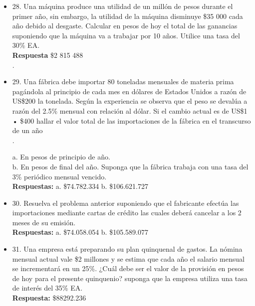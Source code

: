 \begin{itemize}
	\item 28. Una máquina produce una utilidad de un millón de pesos durante el primer año, sin embargo, la utilidad de la máquina disminuye \$35 000 cada año debido al desgaste. Calcular en pesos de hoy el total de las ganancias suponiendo que la máquina va a trabajar por 10 años. Utilice una tasa del 30\% EA.\\
	\textbf{Respuesta} \$2 815 488\\.
	\medskip
	
	\item 29. Una fábrica debe importar 80 toneladas mensuales de materia prima pagándola al principio de cada mes en dólares de Estados Unidos a razón de US\$200 la tonelada. Según la experiencia se observa que el peso se devalúa a razón del 2.5\% mensual con relación al dólar. Si el cambio actual es de US\$1 • \$400 hallar el valor total de las importaciones de la fábrica en el transcurso de un año\\.
	
	a. En pesos de principio de año.\\ 
	b. En pesos de final del año. Suponga que la fábrica trabaja con una tasa del 3\% periódico  mensual vencido.\\
	\textbf{Respuestas:} a. \$74.782.334  \hspace{1.0cm}   b. \$106.621.727\\
	\medskip
	
	\item 30. Resuelva el problema anterior suponiendo que el fabricante efectúa las importaciones mediante cartas de crédito las cuales deberá cancelar a los 2 meses de su emisión.\\
	\textbf{Respuestas:} a. \$74.058.054 \hspace{1,0cm}  b. \$105.589.077\\
	\medskip
	
	\item 31. Una empresa está preparando su plan quinquenal de gastos. La nómina mensual actual vale \$2 millones y se estima que cada año el salario mensual se incrementará en un 25\%. ¿Cuál debe ser el valor de la provisión en pesos de hoy para el presente quinquenio? suponga que la empresa utiliza una tasa de interés del 35\% EA.\\
	\textbf{Respuesta:} \$88292.236\\
	\medskip
	

\end{itemize}
